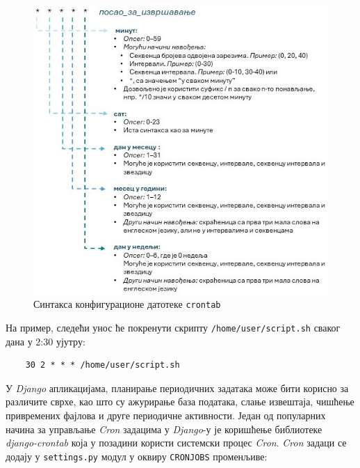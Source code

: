 \documentclass[12pt,oneside]{memoir}
\begin{document}
\begin{figure}[h]
  \centering
  \includegraphics[scale=0.9]{assets/pictures/crontab_syntax.jpg}
  \caption{Синтакса конфигурационе датотеке \texttt{crontab}}
  \label{pic:crontab_syntax}
\end{figure}

На пример, следећи унос ће покренути скрипту \texttt{/home/user/script.sh} сваког дана у 2:30 ујутру:

\begin{lstlisting}
    30 2 * * * /home/user/script.sh
\end{lstlisting}

\vspace{0.7cm}

У \textit{Django} апликацијама, планирање периодичних задатака може бити корисно за различите сврхе, као што су ажурирање база података, слање извештаја, чишћење привремених фајлова и друге периодичне активности. Један од популарних начина за управљање \textit{Cron} задацима у \textit{Django}-у је коришћење библиотеке \textit{django-crontab} \cite{django_crontab} која у позадини користи системски процес \textit{Cron}. \textit{Cron} задаци се додају у \texttt{settings.py} модул у оквиру \texttt{CRONJOBS} променљиве:
\end{document}

